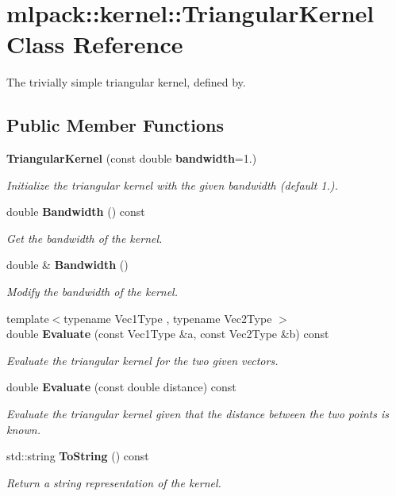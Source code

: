 \section{mlpack\-:\-:kernel\-:\-:Triangular\-Kernel Class Reference}
\label{classmlpack_1_1kernel_1_1TriangularKernel}


The trivially simple triangular kernel, defined by.  


\subsection*{Public Member Functions}
\begin{DoxyCompactItemize}
\item 
{\bf Triangular\-Kernel} (const double {\bf bandwidth}=1.)
\begin{DoxyCompactList}\small\item\em Initialize the triangular kernel with the given bandwidth (default 1.). \end{DoxyCompactList}\item 
double {\bf Bandwidth} () const 
\begin{DoxyCompactList}\small\item\em Get the bandwidth of the kernel. \end{DoxyCompactList}\item 
double \& {\bf Bandwidth} ()
\begin{DoxyCompactList}\small\item\em Modify the bandwidth of the kernel. \end{DoxyCompactList}\item 
{\footnotesize template$<$typename Vec1\-Type , typename Vec2\-Type $>$ }\\double {\bf Evaluate} (const Vec1\-Type \&a, const Vec2\-Type \&b) const 
\begin{DoxyCompactList}\small\item\em Evaluate the triangular kernel for the two given vectors. \end{DoxyCompactList}\item 
double {\bf Evaluate} (const double distance) const 
\begin{DoxyCompactList}\small\item\em Evaluate the triangular kernel given that the distance between the two points is known. \end{DoxyCompactList}\item 
std\-::string {\bf To\-String} () const 
\begin{DoxyCompactList}\small\item\em Return a string representation of the kernel. \end{DoxyCompactList}\end{DoxyCompactItemize}
